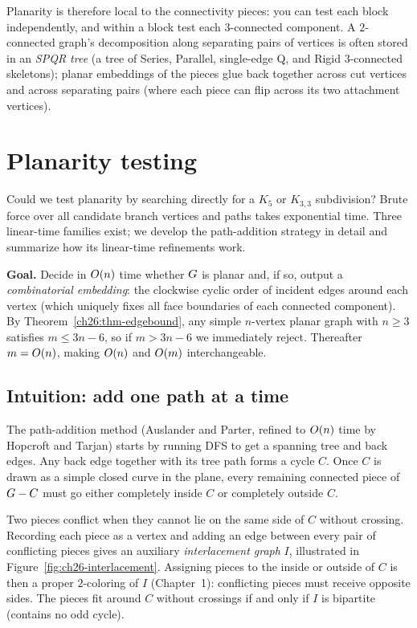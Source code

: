 Planarity is therefore local to the connectivity pieces: you can test each block
independently, and within a block test each $3$-connected component. A $2$-connected
graph's decomposition along separating pairs of vertices is often stored in an \emph{SPQR
tree} (a tree of Series, Parallel, single-edge Q, and Rigid $3$-connected skeletons);
planar embeddings of the pieces glue back together across cut vertices and across
separating pairs (where each piece can flip across its two attachment vertices).

\section{Planarity testing}
\label{ch26:testing}

Could we test planarity by searching directly for a $K_5$ or $K_{3,3}$ subdivision? Brute
force over all candidate branch vertices and paths takes exponential time. Three
linear-time families exist; we develop the path-addition strategy in detail and summarize
how its linear-time refinements work.

\begin{focusbox}
\textbf{Goal.} Decide in $O(n)$ time whether $G$ is planar and, if so, output a
\emph{combinatorial embedding}: the clockwise cyclic order of incident edges around each
vertex (which uniquely fixes all face boundaries of each connected component). By
Theorem~\ref{ch26:thm-edgebound}, any simple $n$-vertex planar graph with $n\ge 3$ satisfies
$m\le 3n-6$, so if $m > 3n-6$ we immediately reject. Thereafter $m = O(n)$, making
$O(n)$ and $O(m)$ interchangeable.
\end{focusbox}

\subsection{Intuition: add one path at a time}

The path-addition method (Auslander and Parter, refined to $O(n)$ time by Hopcroft and
Tarjan) starts by running DFS to get a spanning tree and back edges. Any back edge together
with its tree path forms a cycle $C$. Once $C$ is drawn as a simple closed curve in the
plane, every remaining connected piece of $G - C$ must go either completely inside $C$
or completely outside $C$.

Two pieces conflict when they cannot lie on the same side of $C$ without crossing. Recording
each piece as a vertex and adding an edge between every pair of conflicting pieces gives an
auxiliary \emph{interlacement graph} $I$, illustrated in Figure~\ref{fig:ch26-interlacement}.
Assigning pieces to the inside or outside of $C$ is then a proper $2$-coloring of $I$
(Chapter~1): conflicting pieces must receive opposite sides. The pieces fit around $C$
without crossings if and only if $I$ is bipartite (contains no odd cycle).

